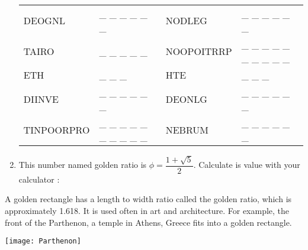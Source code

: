 \begin{enigme}
\begin{enumerate}
\begin{center}
\begin{tabular}{|p{3cm}p{4cm}|p{3cm}p{4cm}|}
         DEOGNL & \_ \_ \_ \_ \_ \_ & NODLEG & \_ \_ \_ \_ \_ \_ \\
         TAIRO & \_ \_ \_ \_ \_ & NOOPOITRRP & \_ \_ \_ \_ \_ \_ \_ \_ \_ \_ \\
         \hline
         ETH & \_ \_ \_ & HTE & \_ \_ \_ \\
         DIINVE & \_ \_ \_ \_ \_ \_ & DEONLG & \_ \_ \_ \_ \_ \_ \\
         TINPOORPRO & \_ \_ \_ \_ \_ \_ \_ \_ \_ \_ & NEBRUM & \_ \_ \_ \_ \_ \_ \\
         \hline
      \end{tabular}
   \end{center}
   \smallskip
   \item This number named golden ratio is $\phi =\dfrac{1+\sqrt5}{2}$. Calculate is value with your calculator : \pointilles
\end{enumerate}

\vfill

\begin{minipage}{10cm}
   A golden rectangle has a length to width ratio called the golden ratio, which is approximately 1.618. It is used often in art and architecture. For example, the front of the Parthenon, a temple in Athens, Greece fits into a golden rectangle.
\end{minipage}
\qquad
\begin{minipage}{5cm}
   \texttt{[image: Parthenon]}
\end{minipage}
\end{enigme}

